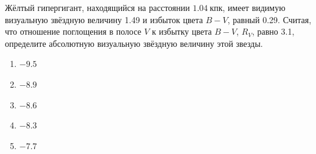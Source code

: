 Жёлтый гипергигант, находящийся на расстоянии $\qty{1.04}{кпк}$, имеет
видимую визуальную звёздную величину 1.49 и избыток цвета $B-V$, равный
0.29. Считая, что отношение поглощения в полосе $V$ к избытку цвета
$B-V$, $R_V$, равно 3.1, определите абсолютную визуальную звёздную
величину этой звезды.

\begin{enumerate}[label=\alph*)]
  \item $-9.5$
  \item $-8.9$
  \item $-8.6$
  \item $-8.3$
  \item $-7.7$
\end{enumerate}

